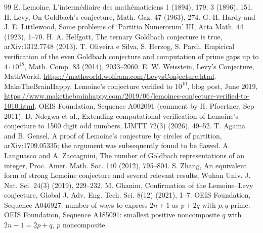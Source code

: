 \documentclass[11pt]{article}
\begin{document}
\begin{thebibliography}{99}
 E. Lemoine, L'interm\'ediaire des math\'ematiciens 1 (1894), 179; 3 (1896), 151.
 H. Levy, On Goldbach's conjecture, Math. Gaz. 47 (1963), 274.
 G. H. Hardy and J. E. Littlewood, Some problems of `Partitio Numerorum' III, Acta Math. 44 (1923), 1--70.
 H. A. Helfgott, The ternary Goldbach conjecture is true, arXiv:1312.7748 (2013).
 T. Oliveira e Silva, S. Herzog, S. Pardi, Empirical verification of the even Goldbach conjecture and computation of prime gaps up to $4\cdot10^{18}$, Math. Comp. 83 (2014), 2033--2060.
 E. W. Weisstein, Levy's Conjecture, MathWorld, \url{https://mathworld.wolfram.com/LevysConjecture.html}.
 MakeTheBrainHappy, Lemoine's conjecture verified to $10^{10}$, blog post, June 2019, \url{https://www.makethebrainhappy.com/2019/06/lemoines-conjecture-verified-to-1010.html}.
 OEIS Foundation, Sequence A002091 (comment by H. Pfoertner, Sep 2011).
 D. Ndegwa et al., Extending computational verification of Lemoine's conjecture to 1500 digit odd numbers, IJMTT 72(3) (2026), 49--52.
 T. Agama and B. Gensel, A proof of Lemoine's conjecture by circles of partition, arXiv:1709.05335; the argument was subsequently found to be flawed.
 A. Languasco and A. Zaccagnini, The number of Goldbach representations of an integer, Proc. Amer. Math. Soc. 140 (2012), 795--804.
 S. Zhang, An equivalent form of strong Lemoine conjecture and several relevant results, Wuhan Univ. J. Nat. Sci. 24(3) (2019), 229--232.
 M. Ghanim, Confirmation of the Lemoine--Levy conjecture, Global J. Adv. Eng. Tech. Sci. 8(12) (2021), 1--7.
 OEIS Foundation, Sequence A046927: number of ways to express $2n+1$ as $p+2q$ with $p,q$ prime.
 OEIS Foundation, Sequence A185091: smallest positive noncomposite $q$ with $2n-1 = 2p+q$, $p$ noncomposite.
\end{thebibliography}
\end{document}
